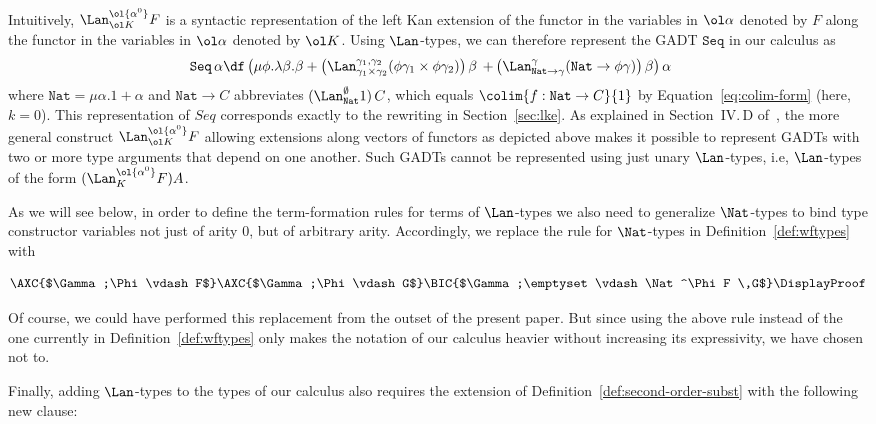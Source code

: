 \documentclass{lmcs}
\theoremstyle{plain}\newtheorem{satz}[thm]{Satz}
\begin{document}
Intuitively, $\Lan^{\ol{\alpha^0}}_{\ol K} F$ is a syntactic representation
of the left Kan extension of the functor in the variables in
$\ol\alpha$ denoted by $F$ along the functor in the variables in
$\ol\alpha$ denoted by $\ol K$. Using $\Lan$-types, we can therefore
represent the GADT $\mathtt{Seq}$ in our calculus as 
 \begin{align*}
\mathtt{Seq}\,\alpha &\df \left( \mu \phi.\lambda \beta.
\beta + \left(\Lan^{\gamma_1,\gamma_2}_{\gamma_1 \times \gamma_2}
(\phi \gamma_1 \times \phi \gamma_2) \right) \beta \right. 
\left. + \left(\Lan^{\gamma}_{\mathtt{Nat} \to \gamma} (\mathtt{Nat} \to \phi
\gamma) \right) \beta \right) \alpha
\end{align*}
\noindent
where $\mathtt{Nat} = \mu \alpha. 1 + \alpha$ and $\mathtt{Nat} \to C$
abbreviates $(\Lan^\emptyset_{\mathtt{Nat}} 1)\,C$, which equals
$\colim{f : \mathtt{Nat} \to C}{1}$ by Equation~\ref{eq:colim-form}
(here, $k = 0$). This representation of $\mathit{Seq}$ corresponds
exactly to the rewriting in Section~\ref{sec:lke}.  As explained in
Section~IV.\,D of~\cite{jp19}, the more general construct
$\Lan^{\ol{\alpha^0}}_{\ol K} F$ allowing extensions along vectors of
functors as depicted above makes it possible to represent GADTs with
two or more type arguments that depend on one another. Such GADTs
cannot be represented using just unary $\Lan$-types, i.e, $\Lan$-types
of the form $(\Lan^{\ol{\alpha^0}}_K F) A$.

As we will see below, in order to define the term-formation rules for
terms of $\Lan$-types we also need to generalize $\Nat$-types to bind
type constructor variables not just of arity $0$, but of arbitrary
arity. Accordingly, we replace the rule for $\Nat$-types in
Definition~\ref{def:wftypes} with

\vspace*{0.05in}

\[
\AXC{$\Gamma;\Phi \vdash F$}
\AXC{$\Gamma;\Phi  \vdash G$}
\BIC{$\Gamma;\emptyset \vdash \Nat^\Phi F \,G$}
\DisplayProof
\]

\vspace*{0.05in}

\noindent
Of course, we could have performed this replacement from the outset of
the present paper. But since using the above rule instead of the one
currently in Definition~\ref{def:wftypes} only makes the notation of
our calculus heavier without increasing its expressivity, we have
chosen not to.

Finally, adding $\Lan$-types to the types of our calculus also
requires the extension of Definition~\ref{def:second-order-subst} with
the following new clause:
\end{document}
